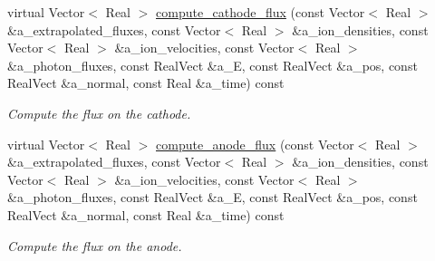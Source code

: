 \begin{DoxyCompactItemize}
virtual Vector$<$ Real $>$ \hyperlink{classair__bolsig_a1df97b9fd97c01e14b13ce1e5dbc5a6a}{compute\+\_\+cathode\+\_\+flux} (const Vector$<$ Real $>$ \&a\+\_\+extrapolated\+\_\+fluxes, const Vector$<$ Real $>$ \&a\+\_\+ion\+\_\+densities, const Vector$<$ Real $>$ \&a\+\_\+ion\+\_\+velocities, const Vector$<$ Real $>$ \&a\+\_\+photon\+\_\+fluxes, const Real\+Vect \&a\+\_\+E, const Real\+Vect \&a\+\_\+pos, const Real\+Vect \&a\+\_\+normal, const Real \&a\+\_\+time) const 
\begin{DoxyCompactList}\small\item\em Compute the flux on the cathode. \end{DoxyCompactList}\item 
virtual Vector$<$ Real $>$ \hyperlink{classair__bolsig_a2270cf4d3ccd1e3599724f91f756f570}{compute\+\_\+anode\+\_\+flux} (const Vector$<$ Real $>$ \&a\+\_\+extrapolated\+\_\+fluxes, const Vector$<$ Real $>$ \&a\+\_\+ion\+\_\+densities, const Vector$<$ Real $>$ \&a\+\_\+ion\+\_\+velocities, const Vector$<$ Real $>$ \&a\+\_\+photon\+\_\+fluxes, const Real\+Vect \&a\+\_\+E, const Real\+Vect \&a\+\_\+pos, const Real\+Vect \&a\+\_\+normal, const Real \&a\+\_\+time) const 
\begin{DoxyCompactList}\small\item\em Compute the flux on the anode. \end{DoxyCompactList}\end{DoxyCompactItemize}
